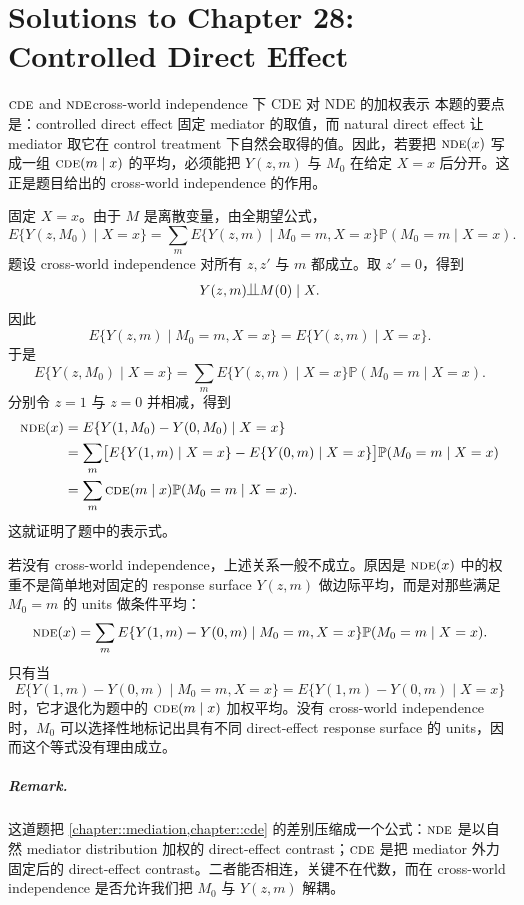 \chapter{Solutions to Chapter 28: Controlled Direct Effect}
\label{sol:chapter28}

\begin{exercisesolution}{$\textsc{cde}$ and $\textsc{nde}$}{cross-world independence 下 CDE 对 NDE 的加权表示}
本题的要点是：controlled direct effect 固定 mediator 的取值，而 natural direct effect 让 mediator 取它在 control treatment 下自然会取得的值。因此，若要把 $\textsc{nde}(x)$ 写成一组 $\textsc{cde}(m\mid x)$ 的平均，必须能把 $Y(z,m)$ 与 $M_0$ 在给定 $X=x$ 后分开。这正是题目给出的 cross-world independence 的作用。

固定 $X=x$。由于 $M$ 是离散变量，由全期望公式，
\[
E\{Y(z,M_0)\mid X=x\}
=
\sum_m E\{Y(z,m)\mid M_0=m,X=x\}\mathbb{P}(M_0=m\mid X=x).
\]
题设 cross-world independence 对所有 $z,z'$ 与 $m$ 都成立。取 $z'=0$，得到
\[
Y(z,m)\ind M(0)\mid X.
\]
因此
\[
E\{Y(z,m)\mid M_0=m,X=x\}
=
E\{Y(z,m)\mid X=x\}.
\]
于是
\[
E\{Y(z,M_0)\mid X=x\}
=
\sum_m E\{Y(z,m)\mid X=x\}\mathbb{P}(M_0=m\mid X=x).
\]
分别令 $z=1$ 与 $z=0$ 并相减，得到
\begin{align*}
\textsc{nde}(x)
&=
E\{Y(1,M_0)-Y(0,M_0)\mid X=x\}\\
&=
\sum_m \bigl[
E\{Y(1,m)\mid X=x\}
-
E\{Y(0,m)\mid X=x\}
\bigr]\mathbb{P}(M_0=m\mid X=x)\\
&=
\sum_m \textsc{cde}(m\mid x)\mathbb{P}(M_0=m\mid X=x).
\end{align*}
这就证明了题中的表示式。

若没有 cross-world independence，上述关系一般不成立。原因是 $\textsc{nde}(x)$ 中的权重不是简单地对固定的 response surface $Y(z,m)$ 做边际平均，而是对那些满足 $M_0=m$ 的 units 做条件平均：
\[
\textsc{nde}(x)
=
\sum_m
E\{Y(1,m)-Y(0,m)\mid M_0=m,X=x\}
\mathbb{P}(M_0=m\mid X=x).
\]
只有当
\[
E\{Y(1,m)-Y(0,m)\mid M_0=m,X=x\}
=
E\{Y(1,m)-Y(0,m)\mid X=x\}
\]
时，它才退化为题中的 $\textsc{cde}(m\mid x)$ 加权平均。没有 cross-world independence 时，$M_0$ 可以选择性地标记出具有不同 direct-effect response surface 的 units，因而这个等式没有理由成立。

\paragraph{Remark.}
这道题把 \cref{chapter::mediation,chapter::cde} 的差别压缩成一个公式：$\textsc{nde}$ 是以自然 mediator distribution 加权的 direct-effect contrast；$\textsc{cde}$ 是把 mediator 外力固定后的 direct-effect contrast。二者能否相连，关键不在代数，而在 cross-world independence 是否允许我们把 $M_0$ 与 $Y(z,m)$ 解耦。
\end{exercisesolution}

